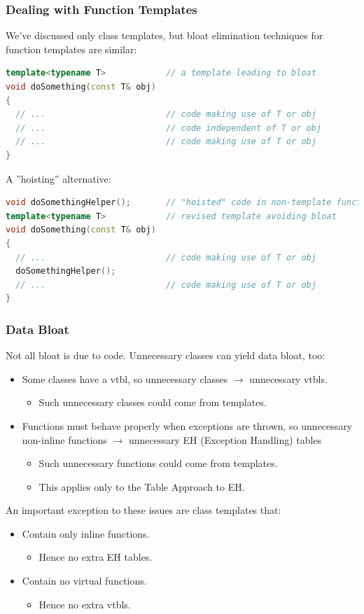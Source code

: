 \subsubsection{Dealing with Function Templates}
We've discussed only class templates, but bloat elimination techniques for function templates are similar:
\begin{lstlisting}[language=C++]
template<typename T>            // a template leading to bloat
void doSomething(const T& obj)
{
  // ...                        // code making use of T or obj
  // ...                        // code independent of T or obj
  // ...                        // code making use of T or obj
}
\end{lstlisting}
A ''hoisting'' alternative:
\begin{lstlisting}[language=C++]
void doSomethingHelper();       // "hoisted" code in non-template function; not inline
template<typename T>            // revised template avoiding bloat
void doSomething(const T& obj)
{
  // ...                        // code making use of T or obj
  doSomethingHelper();
  // ...                        // code making use of T or obj
}
\end{lstlisting}

\subsubsection{Data Bloat}
Not all bloat is due to code. Unnecessary classes can yield data bloat, too:
\begin{itemize}
  \item Some classes have a vtbl, so unnecessary classes $\rightarrow$ unnecessary vtbls.
  \begin{itemize}
    \item Such unnecessary classes could come from templates.
  \end{itemize}
  \item Functions must behave properly when exceptions are thrown, so unnecessary non-inline functions $\rightarrow$ unnecessary EH (Exception Handling) tables
  \begin{itemize}
    \item Such unnecessary functions could come from templates.
    \item This applies only to the Table Approach to EH.
  \end{itemize}
\end{itemize}
An important exception to these issues are class templates that:
\begin{itemize}
  \item Contain only inline functions.
  \begin{itemize}
    \item Hence no extra EH tables.
  \end{itemize}
  \item Contain no virtual functions.
  \begin{itemize}
    \item Hence no extra vtbls.
  \end{itemize}
\end{itemize}


